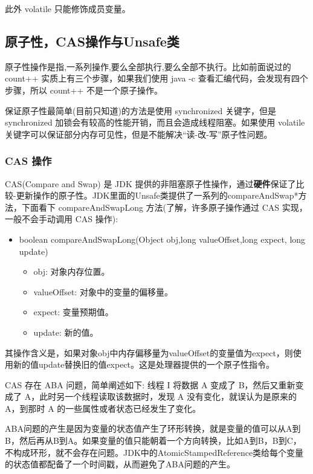 此外 volatile 只能修饰成员变量。

\subsection{原子性，CAS操作与Unsafe类}

原子性操作是指,一系列操作,要么全部执行,要么全部不执行。比如前面说过的 count++ 实质上有三个步骤，如果我们使用 java -c 查看汇编代码，会发现有四个步骤，所以 count++ 不是一个原子操作。

保证原子性最简单(目前只知道)的方法是使用 synchronized 关键字，但是 synchronized 加锁会有较高的性能开销，而且会造成线程阻塞。如果使用 volatile 关键字可以保证部分内存可见性，但是不能解决``读-改-写''原子性问题。

\subsubsection*{CAS 操作}

CAS(Compare and Swap) 是 JDK 提供的非阻塞原子性操作，通过\textbf{硬件}保证了比较-更新操作的原子性。JDK里面的Unsafe类提供了一系列的compareAndSwap*方法，下面看下 compareAndSwapLong 方法(了解，许多原子操作通过 CAS 实现，一般不会手动调用 CAS 操作):

\begin{itemize}
\item boolean compareAndSwapLong(Object obj,long valueOffset,long expect, long update)
    \begin{itemize}
        \item obj: 对象内存位置。
        \item valueOffset: 对象中的变量的偏移量。
        \item expect: 变量预期值。
        \item update: 新的值。
    \end{itemize}
\end{itemize}

其操作含义是，如果对象obj中内存偏移量为valueOffset的变量值为expect，则使用新的值update替换旧的值expect。这是处理器提供的一个原子性指令。

CAS 存在 ABA 问题，简单阐述如下: 线程 I 将数据 A 变成了 B，然后又重新变成了 A，此时另一个线程读取该数据时，发现 A 没有变化，就误认为是原来的 A，到那时 A 的一些属性或者状态已经发生了变化。

ABA问题的产生是因为变量的状态值产生了环形转换，就是变量的值可以从A到B，然后再从B到A。如果变量的值只能朝着一个方向转换，比如A到B，B到C，不构成环形，就不会存在问题。JDK中的AtomicStampedReference类给每个变量的状态值都配备了一个时间戳，从而避免了ABA问题的产生。

